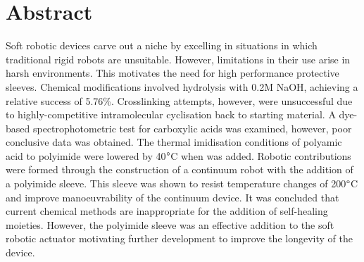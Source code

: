 \chapter*{Abstract}
Soft robotic devices carve out a niche by excelling in situations in which traditional rigid robots are unsuitable. However, limitations in their use arise in harsh environments. This motivates the need for high performance protective sleeves. Chemical modifications involved hydrolysis with 0.2M NaOH, achieving a relative success of 5.76\%. Crosslinking attempts, however, were unsuccessful due to highly-competitive intramolecular cyclisation back to starting material. A dye-based spectrophotometric test for carboxylic acids was examined, however, poor conclusive data was obtained. The thermal imidisation conditions of polyamic acid to polyimide were lowered by 40$\degree$C when  was added. Robotic contributions were formed through the construction of a continuum robot with the addition of a polyimide sleeve. This sleeve was shown to resist temperature changes of 200$\degree$C and improve manoeuvrability of the continuum device. It was concluded that current chemical methods are inappropriate for the addition of self-healing moieties. However, the polyimide sleeve was an effective addition to the soft robotic actuator motivating further development to improve the longevity of the device. 


